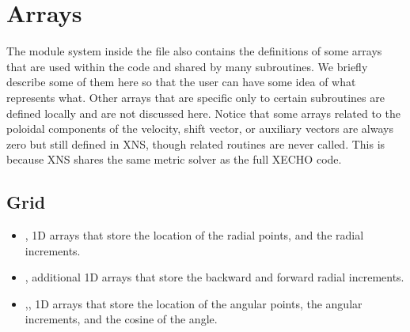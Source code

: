 \documentclass[letterpaper,10pt,english]{sphinxmanual}
\begin{document}
\sphinxstepscope


\chapter{Arrays}
\label{\detokenize{arrays:arrays}}\label{\detokenize{arrays::doc}}
\sphinxAtStartPar
The module system inside the file  also contains the definitions of some arrays that
are used within the code and shared by many subroutines. We briefly describe some of them here so that the
user can have some idea of what represents what. Other arrays that are specific only to certain subroutines
are defined locally and are not discussed here. Notice that some arrays related to the poloidal components
of the velocity, shift vector, or auxiliary vectors are always zero but still defined in XNS, though related
routines are never called. This is because XNS shares the same metric solver as the full X\sphinxhyphen{}ECHO code.


\section{Grid}
\label{\detokenize{arrays:grid}}\begin{itemize}
\item {} 
\sphinxAtStartPar
{}, \sphinxhyphen{} 1D arrays that store the location of the radial points, and the radial increments.


\item {} 
\sphinxAtStartPar
{}, \sphinxhyphen{} additional 1D arrays that store the backward and forward radial increments.


\item {} 
\sphinxAtStartPar
{},, \sphinxhyphen{} 1D arrays that store the location of the angular points, the angular increments, and the
cosine of the angle.

\end{itemize}
\end{document}
